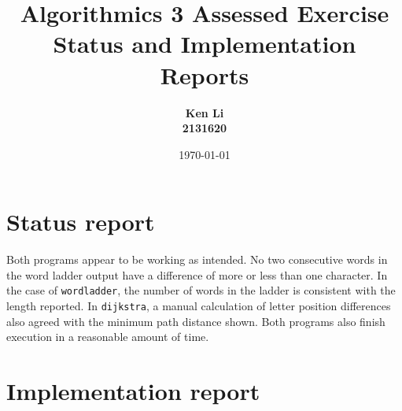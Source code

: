 \documentclass{article}
\title{Algorithmics 3 Assessed Exercise\\ \vspace{4mm}
Status and Implementation Reports}
\author{\bf Ken Li\\ \bf 2131620}
\date{\today}
\begin{document}
\maketitle

\section*{Status report}

Both programs appear to be working as intended. No two consecutive words in the word ladder output have a difference of more or less than one character. In the case of \texttt{wordladder}, the number of words in the ladder is consistent with the length reported. In \texttt{dijkstra}, a manual calculation of letter position differences also agreed with the minimum path distance shown. Both programs also finish execution in a reasonable amount of time.

\section*{Implementation report}
\end{document}
